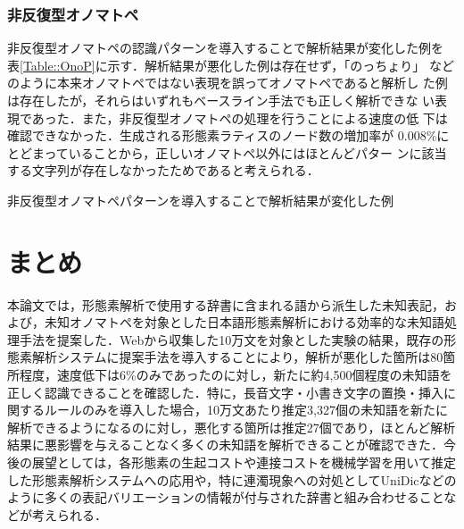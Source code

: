 \documentclass[japanese]{jnlp_1.4}
\begin{document}
  \subsubsection{非反復型オノマトペ}
  非反復型オノマトペの認識パターンを導入することで解析結果が変化した例を
  表\ref{Table::OnoP}に示す．解析結果が悪化した例は存在せず，「のっちょり」
  などのように本来オノマトペではない表現を誤ってオノマトペであると解析し
  た例は存在したが，それらはいずれもベースライン手法でも正しく解析できな
  い表現であった．また，非反復型オノマトペの処理を行うことによる速度の低
  下は確認できなかった．生成される形態素ラティスのノード数の増加率が
  0.008\%にとどまっていることから，正しいオノマトペ以外にはほとんどパター
  ンに該当する文字列が存在しなかったためであると考えられる．

  \begin{table}[b]
   \caption{非反復型オノマトペパターンを導入することで解析結果が変化した例}
 \label{Table::OnoP}

  \end{table}



 \section{まとめ}

 本論文では，形態素解析で使用する辞書に含まれる語から派生した未知表記，お
 よび，未知オノマトペを対象とした日本語形態素解析における効率的な未知語処
 理手法を提案した．Webから収集した10万文を対象とした実験の結果，既存の形
 態素解析システムに提案手法を導入することにより，解析が悪化した箇所は80箇
 所程度，速度低下は6\%のみであったのに対し，新たに約4,500個程度の未知語を
 正しく認識できることを確認した．特に，長音文字・小書き文字の置換・挿入に
 関するルールのみを導入した場合，10万文あたり推定3,327個の未知語を新たに
 解析できるようになるのに対し，悪化する箇所は推定27個であり，ほとんど解析
 結果に悪影響を与えることなく多くの未知語を解析できることが確認できた．今
 後の展望としては，各形態素の生起コストや連接コストを機械学習を用いて推定
 した形態素解析システムへの応用や，特に連濁現象への対処としてUniDicなどの
 ように多くの表記バリエーションの情報が付与された辞書と組み合わせることな
 どが考えられる．
 
\end{document}
